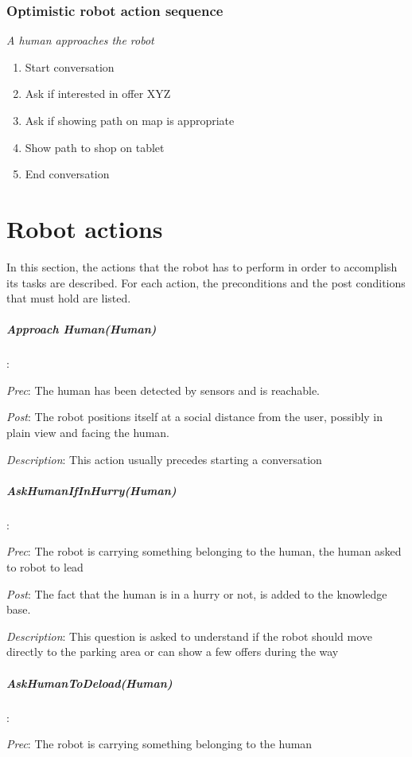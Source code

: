 \subsubsection{Optimistic robot action sequence}

\textit{A human approaches the robot}
\begin{enumerate}
\item Start conversation
\item Ask if interested in offer XYZ
\item Ask if showing path on map is appropriate
\item Show path to shop on tablet
\item End conversation
\end{enumerate}

\section{Robot actions}

In this section, the actions that the robot has to perform in order to
accomplish its tasks are described.
For each action, the preconditions and the post conditions that must hold are
listed. 


\subparagraph{Approach Human(Human)}

:

\textit{Prec}: The human has been detected by sensors and is reachable.

\textit{Post}: The robot positions itself at a social distance from
the user, possibly in plain view and facing the human.

\textit{Description}: This action usually precedes starting a conversation


\subparagraph{AskHumanIfInHurry(Human)}

:

\textit{Prec}: The robot is carrying something belonging to the human,
the human asked to robot to lead

\textit{Post}: The fact that the human is in a hurry or not, is added
to the knowledge base.

\textit{Description}: This question is asked to understand if the
robot should move directly to the parking area or can show a few offers
during the way


\subparagraph{AskHumanToDeload(Human)}

:

\textit{Prec}: The robot is carrying something belonging to the human

